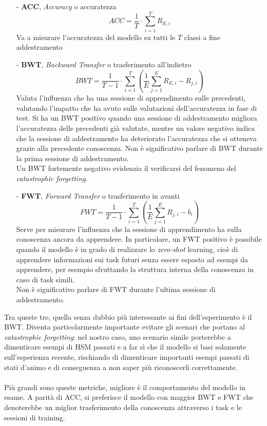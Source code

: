 \begin{itemize}
    \item[-] \textbf{ACC}, \textit{Accuracy} o accuratezza
        \begin{equation}\label{eq:fun_acc}
            ACC = \frac{1}{T}\cdot\sum_{i=1}^T R_{E,i}
        \end{equation}
    Va a misurare l'accuratezza del modello su tutti le $T$ classi a fine addestramento
    \item[-] \textbf{BWT}, \textit{Backward Transfer} o trasferimento all'indietro
        \begin{equation}\label{eq:fun_bwt}
            BWT = \frac{1}{T-1}\cdot\sum_{i=1}^T\left(\frac{1}{E}\sum_{j=1}^E R_{E,i} - R_{j,i}\right)
        \end{equation}
    Valuta l'influenza che ha una sessione di apprendimento sulle precedenti, valutando l'impatto che ha avuto sulle valutazioni dell'accuratezza in fase di test. Si ha un BWT positivo quando una sessione di addestramento migliora l'accuratezza delle precedenti già valutate, mentre un valore negativo indica che la sessione di addestramento ha deteriorato l'accuratezza che si otteneva grazie alla precedente conoscenza. Non è significativo parlare di BWT durante la prima sessione di addestramento.\\
    Un BWT fortemente negativo evidenzia il verificarsi del fenomeno del \textit{catastrophic forgetting}.
    \item[-] \textbf{FWT}, \textit{Forward Transfer} o trasferimento in avanti
        \begin{equation}\label{eq:fun_fwt}
            FWT = \frac{1}{T-1}\cdot\sum_{i=1}^T\left(\frac{1}{E}\sum_{j=1}^E R_{j,i} - \overline{b}_i\right)
        \end{equation}
    Serve per misurare l'influenza che la sessione di apprendimento ha sulla conoscenza ancora da apprendere. In particolare, un FWT positivo è possibile quando il modello è in grado di realizzare lo \textit{zero-shot} learning, cioè di apprendere informazioni sui task futuri senza essere esposto ad esempi da apprendere, per esempio sfruttando la struttura interna della conoscenza in caso di task simili.\\
    Non è significativo parlare di FWT durante l'ultima sessione di addestramento.
\end{itemize}
Tra queste tre, quella senza dubbio più interessante ai fini dell'esperimento è il BWT. Diventa particolarmente importante evitare gli scenari che portano al \textit{catastrophic forgetting}: nel nostro caso, uno scenario simile porterebbe a dimenticare esempi di HSM passati e a far sì che il modello si basi solamente sull'esperienza recente, rischiando di dimenticare importanti esempi passati di stati d'animo e di conseguenza a non saper più riconoscerli correttamente.\\\\
Più grandi sono queste metriche, migliore è il comportamento del modello in esame. A parità di ACC, si preferisce il modello con maggior BWT e FWT che denoterebbe un miglior trasferimento della conoscenza attraverso i task e le sessioni di training.
\pagebreak
